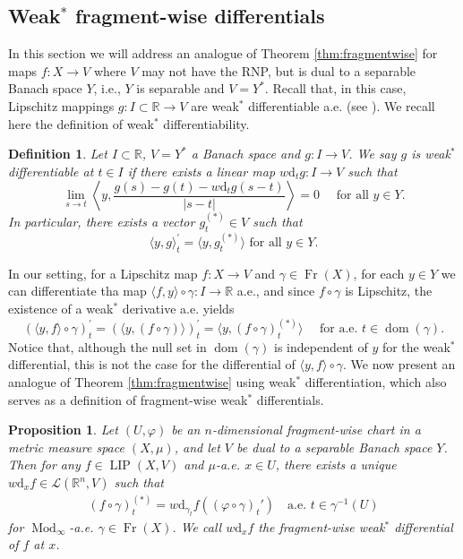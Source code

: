 \documentclass{amsart}
\newtheorem{definition}[theorem]{Definition}
\newtheorem{proposition}[theorem]{Proposition}
\numberwithin{equation}{section}
\newcommand{\R}{\mathbb{R}}
\newcommand{\leb}{\mathcal{L}}
\newcommand{\Mod}{\operatorname{Mod}}
\newcommand{\LIP}{\operatorname{LIP}}
\newcommand{\dom}{\operatorname{dom}}
\newcommand{\Fr}{\operatorname{Fr}}
\newcommand{\ud}{\mathrm {d}}
\begin{document}
\subsection{Weak$^*$ fragment-wise differentials}\label{sec:w-star}
In this section we will address an analogue of Theorem \ref{thm:fragmentwise} for maps $f:X\rightarrow V$ where $V$ may not have the RNP, but is dual to a separable Banach space $Y$, i.e., $Y$ is separable and $V=Y^*$. Recall that, in this case, Lipschitz mappings $g:I\subset\R \to V$ are weak$^*$ differentiable a.e. (see \cite[Theorem 3.5]{amb-kir00}). We recall here the definition of weak$^*$ differentiability.
\begin{definition}\label{def:w-star}
    Let $I\subset \R$, $V=Y^*$ a Banach space and $g:I\rightarrow V$. We say $g$ is weak$^*$ differentiable at $t\in I$ if there exists a linear map $w\ud_tg:I\rightarrow V$ such that
    \[
    \lim_{s\to t}\left\langle y, \frac{ g(s)-g(t)-w\ud_tg(s-t) }{|s-t|}\right\rangle
     =0\quad\mbox{ for all }y\in Y.
     \]
     In particular, there exists a vector $g_t^{(*)}\in V$ such that
     \[
     \langle y,g\rangle_t^\prime =\langle y, g^{(*)}_t\rangle\mbox{ for all }y\in Y.
     \]
\end{definition}
 In our setting, for a Lipschitz map $f:X\rightarrow V$ and $\gamma\in \Fr (X)$, for each $y\in Y$ we can differentiate tha map $\langle f,y\rangle\circ\gamma  :I\rightarrow \R $ a.e., and since $f\circ\gamma$ is Lipschitz, the existence of a weak$^*$ derivative a.e.  yields
 \begin{equation}\label{eq:w-starderivative}
     (\langle y,f\rangle\circ\gamma )_t^\prime =( \langle y,(f\circ\gamma ) \rangle)_t^\prime  =\langle y,(f\circ\gamma )_t^{(*)} \rangle \quad \mbox{ for a.e. }t\in\dom (\gamma ).
 \end{equation}
 Notice that, although the null set in $\dom (\gamma )$ is independent of $y$ for the weak$^*$ differential, this is not the case for the differential of $\langle y,f\rangle\circ \gamma $.
 We now present an analogue of Theorem \ref{thm:fragmentwise} using weak$^*$ differentiation, which also serves as a definition of fragment-wise weak$^*$ differentials.
\begin{proposition}\label{prop:w-star}
    Let $(U,\varphi)$ be an $n$-dimensional fragment-wise chart in a metric measure space $(X,\mu)$, and let $V$ be dual to a separable Banach space $Y$. Then for any $f\in\LIP(X,V)$ and $\mu$-a.e. $x\in U$, there exists a unique $w\ud_xf\in \leb(\R^n,V)$ such that 
\begin{align*}
(f\circ\gamma)^{(*)}_t= w\ud_{\gamma_t}f((\varphi\circ\gamma)_t')\quad\textrm{a.e. }t\in \gamma^{-1} (U)
\end{align*}
for $\Mod_\infty$-a.e. $\gamma\in\Fr(X)$. We call $w\ud_xf$ the fragment-wise weak$^*$ differential of $f$ at $x$.
\end{proposition}
\end{document}
